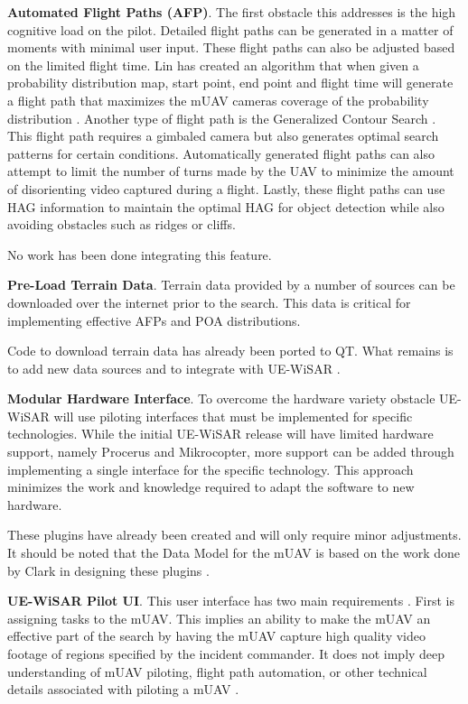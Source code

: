 \documentclass[12pt]{IEEEtran}
\begin{document}
\textbf{Automated Flight Paths (AFP)}.  The first obstacle this addresses is the
high cognitive load on the pilot.  Detailed flight paths can be generated in a matter of
moments with minimal user input.  These flight paths can also be adjusted based
on the limited flight time.  Lin has created an algorithm
that when given a probability distribution map, start point, end point and
flight time will generate a flight path that maximizes the mUAV cameras coverage
of the probability distribution \cite{lin2009uav}.  Another type of flight path
is the Generalized Contour Search \cite{goodrich2008supporting}.  This flight
path requires a gimbaled camera but also generates optimal search patterns for certain
conditions.  Automatically generated flight paths can also attempt to limit the
number of turns made by the UAV to minimize the amount of disorienting video
captured during a flight.  Lastly, these flight paths can use HAG information to
maintain the optimal HAG for object detection while also avoiding obstacles such
as ridges or cliffs.

No work has been done integrating this feature.

\textbf{Pre-Load Terrain Data}.  Terrain data provided by a number of sources
can be downloaded over the internet prior to the search.  This data is critical for
implementing effective AFPs and POA distributions.

Code to download terrain data has already been ported to QT.  What remains is to
add new data sources and to integrate with UE-WiSAR \cite{uavCode}.

\textbf{Modular Hardware Interface}.  To overcome the hardware variety obstacle
UE-WiSAR will use piloting interfaces that must be implemented for specific technologies.
While the initial UE-WiSAR release will have limited hardware support, namely
Procerus and Mikrocopter, more support can be added through implementing a
single interface for the specific technology.  This approach minimizes the work and knowledge required to adapt
the software to new hardware.

These plugins have already been created and will only require minor adjustments.
It should be noted that the Data Model for the mUAV is based on the work done by
Clark in designing these plugins \cite{uavCode}.

\textbf{UE-WiSAR Pilot UI}.  This user interface has two main
requirements \cite{lin2010supporting}.  First is assigning tasks to the mUAV. 
This implies an ability to make the mUAV an effective part of the search by
having the mUAV capture high quality video footage of regions specified by the
incident commander.  It does not imply deep understanding of mUAV piloting,
flight path automation, or other technical details associated with piloting a
mUAV \cite{cooper2007supporting}.
\end{document}
